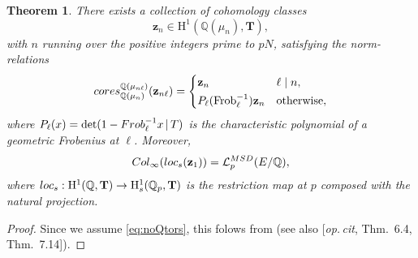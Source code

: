 \documentclass[10pt,reqno]{amsart}
\numberwithin{equation}{section}
\theoremstyle{plain}
\newtheorem{thm}{Theorem}[subsection] %
\theoremstyle{definition}
\theoremstyle{definition}
\theoremstyle{plain}
\theoremstyle{plain}
\theoremstyle{plain}
\theoremstyle{plain}
\theoremstyle{plain}
\theoremstyle{plain}
\newcommand{\Z}{\mathbb{Z}}
\newcommand{\Q}{\mathbb{Q}}
\newcommand{\bkappa}{\boldsymbol{\kappa}}
\DeclareMathOperator{\frob}{Frob}
\newcommand{\Lcal}{\mathcal{L}}
\newcommand{\rH}{\mathrm{H}}
\begin{document}
\begin{thm}\label{thm:kato}
There exists a collection of cohomology classes 
\[
\mathbf{z}_n\in\rH^1(\Q(\mu_n),\mathbf{T}),
\]
with $n$ running over the positive integers prime to $pN$, satisfying the norm-relations
\[
{\rm cores}^{\Q(\mu_{n\ell})}_{\Q(\mu_{n})}(\mathbf{z}_{n\ell})=\begin{cases}
\mathbf{z}_n &\ell\mid n,\\[0.2em]
P_{\ell}(\frob_{\ell}^{-1})\mathbf{z}_n &\text{otherwise},
\end{cases}
\]
where $P_{\ell}(x)=\det(1-{\rm Frob}_{\ell}^{-1}x\,|\,T)$ is the characteristic polynomial of 
a geometric Frobenius at $\ell$. Moreover,
\[
{\rm Col}_\infty({\rm loc}_s(\mathbf{z}_1))=\Lcal_p^{\rm MSD}(E/\Q),
\]
where ${\rm loc}_s:\rH^1(\Q,\mathbf{T})\rightarrow\rH^1_s(\Q_p,\mathbf{T})$ is the restriction map at $p$ composed with the natural projection.
\end{thm}

\begin{proof}
Since we assume \eqref{eq:noQtors}, this folows from \cite[Thm.~6.1]{kataoka} (see also [\emph{op.\,cit}, Thm.~6.4, Thm.~7.14]). 
\end{proof}

 
\end{document}
